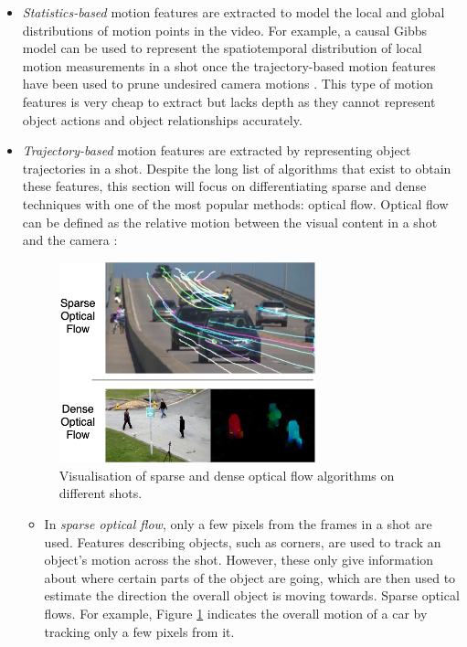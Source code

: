 \begin{itemize}
    
    \item \textit{Statistics-based} motion features are extracted to model the local and global distributions of motion points in the video. For example, a causal Gibbs model can be used to represent the spatiotemporal distribution of local motion measurements in a shot once the trajectory-based motion features have been used to prune undesired camera motions \cite{fablet2002gibbsmodel}. This type of motion features is very cheap to extract but lacks depth as they cannot represent object actions and object relationships accurately.
    
    \item \textit{Trajectory-based} motion features are extracted by representing object trajectories in a shot. Despite the long list of algorithms that exist to obtain these features, this section will focus on differentiating sparse and dense techniques with one of the most popular methods: optical flow. Optical flow can be defined as the relative motion between the visual content in a shot and the camera \cite{bradski2008opencv}:
    
    \begin{figure}[h] 
    \centerline{\includegraphics[width=0.7\textwidth]{figures/litsurvey/optical_flow.png}}
    \caption{\label{fig:optical_flow}Visualisation of sparse and dense optical flow algorithms on different shots.}
    \end{figure}
    
    \begin{itemize}
        
        \item In \textit{sparse optical flow}, only a few pixels from the frames in a shot are used. Features describing objects, such as corners, are used to track an object's motion across the shot. However, these only give information about where certain parts of the object are going, which are then used to estimate the direction the overall object is moving towards. Sparse optical flows. For example, Figure \ref{fig:optical_flow} indicates the overall motion of a car by tracking only a few pixels from it.
        

\end{itemize}
\end{itemize}
